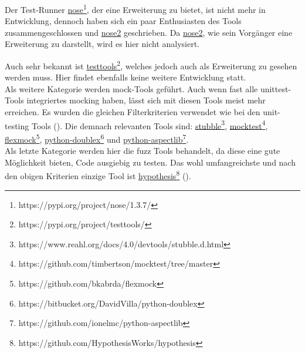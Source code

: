 Der Test-Runner
\href{https://pypi.org/project/nose/1.3.7/}{nose}\footnote{https://pypi.org/project/nose/1.3.7/},
der eine Erweiterung zu  bietet, ist nicht mehr
in Entwicklung, dennoch haben sich ein paar Enthusiasten des Tools
zusammengeschlossen und
\href{https://pypi.org/project/nose2/}{nose2}
geschrieben. Da \href{https://pypi.org/project/nose2/}{nose2},
wie sein Vorgänger eine Erweiterung zu  
darstellt, wird es hier nicht analysiert.

Auch sehr bekannt ist
\href{https://pypi.org/project/testtools/}{testtools}\footnote{https://pypi.org/project/testtools/},
welches jedoch auch als Erweiterung zu  gesehen 
werden muss. Hier findet ebenfalls keine weitere Entwicklung statt.
\newline
\\
Als weitere Kategorie werden \Gls{mock}-Tools geführt. Auch wenn fast alle
unittest-Tools integriertes \gls{mock}ing haben, lässt sich mit diesen
Tools meist mehr erreichen. Es wurden die gleichen Filterkriterien verwendet
wie bei den unit-testing Tools (\cite{wiki.python:PythonTestingToolsTaxonomy}).
Die demnach relevanten Tools sind:
\href{https://www.reahl.org/docs/4.0/devtools/stubble.d.html}{stubble}\footnote{https://www.reahl.org/docs/4.0/devtools/stubble.d.html},
\href{https://github.com/timbertson/mocktest/tree/master}{mocktest}\footnote{https://github.com/timbertson/mocktest/tree/master},
\href{https://github.com/bkabrda/flexmock}{flexmock}\footnote{https://github.com/bkabrda/flexmock},
\href{https://bitbucket.org/DavidVilla/python-doublex}{python-doublex}\footnote{https://bitbucket.org/DavidVilla/python-doublex}
und 
\href{https://github.com/ionelmc/python-aspectlib}{python-aspectlib}\footnote{https://github.com/ionelmc/python-aspectlib}.
\newline
\\
Als letzte Kategorie werden hier die \Gls{fuzz} Tools behandelt, da diese eine
gute Möglichkeit bieten, Code ausgiebig zu testen. Das wohl umfangreichste und
nach den obigen Kriterien einzige Tool ist
\href{https://github.com/HypothesisWorks/hypothesis}{hypothesis}\footnote{https://github.com/HypothesisWorks/hypothesis}
(\cite{wiki.python:PythonTestingToolsTaxonomy}).




